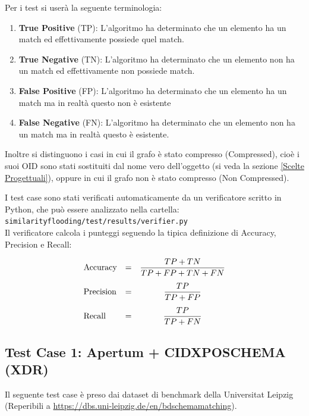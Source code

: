 \documentclass[a4paper,10pt]{article}
\begin{document}
Per i test si userà la seguente terminologia:
\begin{enumerate}
	\item \textbf{True Positive} (TP): L'algoritmo ha determinato che un elemento ha un match ed effettivamente possiede quel match.
	\item \textbf{True Negative} (TN): L'algoritmo ha determinato che un elemento non ha un match ed effettivamente non possiede match.
	\item \textbf{False Positive} (FP): L'algoritmo ha determinato che un elemento ha un match ma in realtà questo non è esistente
	\item \textbf{False Negative} (FN): L'algoritmo ha determinato che un elemento non ha un match ma in realtà questo è esistente.
\end{enumerate}

Inoltre si distinguono i casi in cui il grafo è stato compresso (Compressed), cioè i suoi OID sono stati sostituiti dal nome vero dell'oggetto (si veda la sezione \ref{Scelte Progettuali}), oppure in cui il grafo non è stato compresso (Non Compressed).

I test case sono stati verificati automaticamente da un verificatore scritto in Python, che può essere analizzato nella cartella:\\

\texttt{similarityflooding/test/results/verifier.py}\\

Il verificatore calcola i punteggi seguendo la tipica definizione di Accuracy, Precision e Recall:

\[
	\begin{array}{lcc}
		\text{Accuracy} &= &\dfrac{TP+TN}{TP+FP+TN+FN}\\[\bigskipamount]
		
		\text{Precision} &= &\dfrac{TP}{TP+FP}\\[\bigskipamount]
		
		\text{Recall} &= &\dfrac{TP}{TP+FN}
	\end{array}
\]

\newpage

\subsection{Test Case 1: Apertum + CIDXPOSCHEMA (XDR)}

Il seguente test case è preso dai dataset di benchmark della Universitat Leipzig (Reperibili a \url{https://dbs.uni-leipzig.de/en/bdschemamatching}).\\
\end{document}
